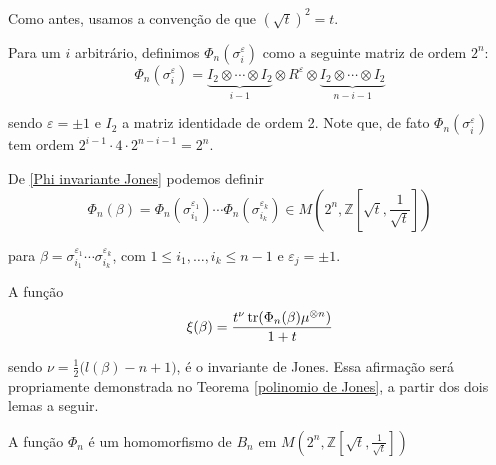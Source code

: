 	\par\vspace{0.3cm} Como antes, usamos a convenção de que $(\sqrt{t})^2 = t$.
	\par\vspace{0.3cm} Para um $i$ arbitrário, definimos $\Phi_n(\sigma_i^{\varepsilon})$ como a seguinte matriz de ordem $2^n$:
	\begin{equation}
	\label{Phi invariante Jones}
	\Phi_n(\sigma_i^{\varepsilon}) = \underbrace{I_2\otimes\cdots\otimes I_2}_{i-1}\otimes R^{\varepsilon}\otimes\underbrace{I_2\otimes\cdots\otimes I_2}_{n-i-1}
	\end{equation}
	\par\vspace{0.3cm} sendo $\varepsilon=\pm1$ e $I_2$ a matriz identidade de ordem 2. Note que, de fato $\Phi_n(\sigma_i^{\varepsilon})$ tem ordem $2^{i-1}\cdot4\cdot2^{n-i-1} = 2^n$.
	\par\vspace{0.3cm} De \eqref{Phi invariante Jones} podemos definir
	\begin{equation}
	\label{parte 2 invariante Jones}
	\Phi_n(\beta) = \Phi_n(\sigma_{i_1}^{\varepsilon_1})\cdots\Phi_n(\sigma_{i_k}^{\varepsilon_k})\in M(2^n, \mathbb{Z}[\sqrt{t}, \frac{1}{\sqrt{t}}])
	\end{equation}
	\par\vspace{0.3cm} para $\beta = \sigma_{i_1}^{\varepsilon_1}\cdots\sigma_{i_k}^{\varepsilon_k}$, com $1\leq i_1, \dots, i_k\leq n-1$ e $\varepsilon_j=\pm1$. 
	\par\vspace{0.3cm} A função
	\begin{equation*}
	\xi(\beta) = \frac{t^{\nu}\operatorname{tr}(\Phi_n(\beta)\mu^{\otimes n})}{1+t}
	\end{equation*}
	\par\vspace{0.3cm} sendo $\nu = \displaystyle{ \frac{1}{2}\big(l(\beta) - n + 1\big) }$, é o invariante de Jones. Essa afirmação será propriamente demonstrada no Teorema \eqref{polinomio de Jones}, a partir dos dois lemas a seguir.
	\begin{lemma}
		\label{lema 1 Jones}
		A função $\Phi_n$ é um homomorfismo de $B_n$ em $M(2^n, \mathbb{Z}[\sqrt{t}, \frac{1}{\sqrt{t}}])$
	\end{lemma}

